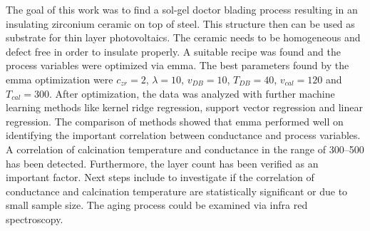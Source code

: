 The goal of this work was to find a sol-gel doctor blading process resulting in an insulating zirconium ceramic on top of steel.
This structure then can be used as substrate for thin layer photovoltaics. 
The ceramic needs to be homogeneous and defect free in order to insulate properly.
A suitable recipe was found\cite{Hu2016} and the process variables were optimized via \gls{emma}. 
The best parameters found by the \gls{emma} optimization were 
$c_{zr}=2$, $\lambda=10$, $v_{DB}=10$, $T_{DB}=40$, $v_{cal}=120$ and $T_{cal}=300$.
After optimization, the data was analyzed with further machine learning methods like kernel ridge regression, support vector regression and linear regression. 
The comparison of methods showed that \gls{emma} performed well on identifying the important correlation between conductance and process variables. 
A correlation of calcination temperature and conductance in the range of 300--500\oc{} has been detected.
Furthermore, the layer count has been verified as an important factor. 
Next steps include to investigate if the correlation of conductance and calcination temperature are statistically significant or due to small sample size. 
The aging process could be examined via infra red spectroscopy. 
\iffalse
was kann noch veraendert werden? 
humidity 
solution age
vdb and tdb on g and phd 
Tcal on g and phd 

Making of the solution for the sol-gel process:
For a single concentrated solution \ml{0.05} of \gls{zrpro} are added while stirring to \ml{4.95} of \gls{buoh} and stirred for \minutes{15}. 
\ml{0.013} (or one molar equvilent of Zr) of \gls{acac} is added to the stirring solution. 
After another \minutes{15} \ml{1} of acetic acid is added and stirred for \minutes{30} to stabilize the solution up to \h{24}. 

The concentration can be increased up to 5 times being stable for a minimum of \h{4}. 
The sol-gel process produces am homogeneous transparent crystalline zirconia oxide layer. 
homogeneity can be mainly controlled via blade velocity and temperature and layers can be stacked.

It should have been also verglichen with grid search with comparable size
but most time was used to find a vernuenfig base recipe and process

It is still very human 
Der process is - as it the case with all ML and most fitting processes - is very abhaengig von hyper parameters, 
In the current work population size, number of generations, and most importantly boundaries (grenzen). 
\fi
